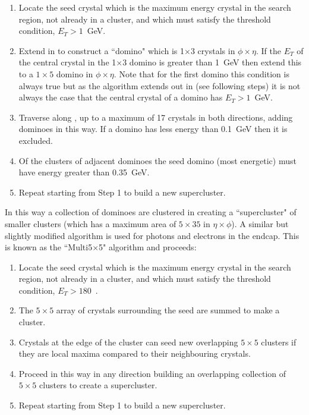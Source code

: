 \begin{enumerate}
  \item{Locate the seed crystal which is the maximum energy crystal in the search region, not already in a cluster, and which must satisfy the threshold condition, $E_{T}>1$~GeV.}
  \item{Extend in \eta to construct a ``domino" which is 1$\times$3 crystals in $\phi\times\eta$. If the $E_{T}$ of the central crystal in the 1$\times$3 domino is greater than 1~GeV then extend this to a $1\times5$ domino in $\phi\times\eta$. Note that for the first domino this condition is always true but as the algorithm extends out in \phi (see following steps) it is not always the case that the central crystal of a domino has $E_{T}>1$~GeV.}
  \item{Traverse along \phi, up to a maximum of 17 crystals in both directions, adding dominoes in this way. If a domino has less energy than 0.1~GeV then it is excluded.}
  \item{Of the clusters of adjacent dominoes the seed domino (most energetic) must have energy greater than 0.35~GeV.}
  \item{Repeat starting from Step 1 to build a new supercluster.}
\end{enumerate}
In this way a collection of dominoes are clustered in \phi creating a ``supercluster" of smaller clusters (which has a maximum area of $5\times35$ in $\eta\times\phi$). A similar but slightly modified algorithm is used for photons and electrons in the endcap. This is known as the ``Multi5$\times$5" algorithm and proceeds:

\begin{enumerate}
  \item{Locate the seed crystal which is the maximum energy crystal in the search region, not already in a cluster, and which must satisfy the threshold condition, $E_{T}>180$~\MeV.}
  \item{The $5\times5$ array of crystals surrounding the seed are summed to make a cluster.}
  \item{Crystals at the edge of the cluster can seed new overlapping $5\times5$ clusters if they are local maxima compared to their neighbouring crystals.}
  \item{Proceed in this way in any direction building an overlapping collection of $5\times5$ clusters to create a supercluster.}
  \item{Repeat starting from Step 1 to build a new supercluster.}
\end{enumerate}

